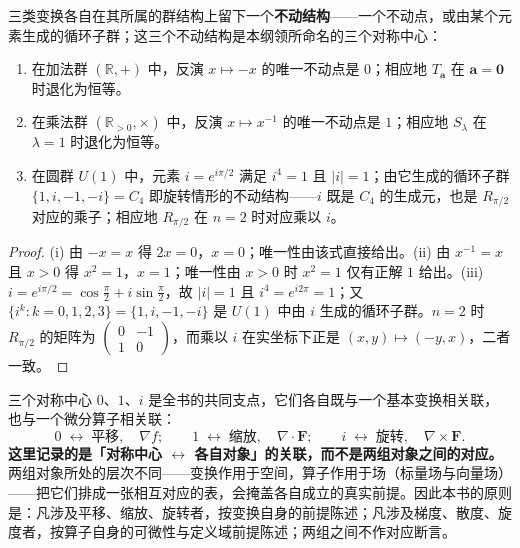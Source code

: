 \begin{proposition}[三个对称中心]\label{prop:three_centres}
三类变换各自在其所属的群结构上留下一个\textbf{不动结构}——一个不动点，或由某个元素生成的循环子群；这三个不动结构是本纲领所命名的三个对称中心：
\begin{enumerate}[label=(\roman*)]
    \item 在加法群 $(\mathbb{R},+)$ 中，反演 $x \mapsto -x$ 的唯一不动点是 $0$；相应地 $T_{\mathbf a}$ 在 $\mathbf a=\mathbf 0$ 时退化为恒等。
    \item 在乘法群 $(\mathbb{R}_{>0},\times)$ 中，反演 $x \mapsto x^{-1}$ 的唯一不动点是 $1$；相应地 $S_\lambda$ 在 $\lambda=1$ 时退化为恒等。
    \item 在圆群 $U(1)$ 中，元素 $i = e^{i\pi/2}$ 满足 $i^4 = 1$ 且 $|i| = 1$；由它生成的循环子群 $\{1,i,-1,-i\}=C_4$ 即旋转情形的不动结构——$i$ 既是 $C_4$ 的生成元，也是 $R_{\pi/2}$ 对应的乘子；相应地 $R_{\pi/2}$ 在 $n=2$ 时对应乘以 $i$。
\end{enumerate}
\end{proposition}

\begin{proof}
(i) 由 $-x=x$ 得 $2x=0$，$x=0$；唯一性由该式直接给出。(ii) 由 $x^{-1}=x$ 且 $x>0$ 得 $x^2=1$，$x=1$；唯一性由 $x>0$ 时 $x^2=1$ 仅有正解 $1$ 给出。(iii) $i=e^{i\pi/2}=\cos\frac\pi2+i\sin\frac\pi2$，故 $|i|=1$ 且 $i^4=e^{i2\pi}=1$；又 $\{i^k:k=0,1,2,3\}=\{1,i,-1,-i\}$ 是 $U(1)$ 中由 $i$ 生成的循环子群。$n=2$ 时 $R_{\pi/2}$ 的矩阵为 $\left(\begin{smallmatrix}0&-1\\1&0\end{smallmatrix}\right)$，而乘以 $i$ 在实坐标下正是 $(x,y)\mapsto(-y,x)$，二者一致。
\end{proof}

\begin{remark}[三个对称中心与两组对象的关联方式]\label{rem:centres_and_two_triples}
三个对称中心 $0$、$1$、$i$ 是全书的共同支点，它们各自既与一个基本变换相关联，也与一个微分算子相关联：
\[
0 \;\longleftrightarrow\; \text{平移},\quad \nabla f;
\qquad
1 \;\longleftrightarrow\; \text{缩放},\quad \nabla\cdot\mathbf{F};
\qquad
i \;\longleftrightarrow\; \text{旋转},\quad \nabla\times\mathbf{F}.
\]
\textbf{这里记录的是「对称中心 $\leftrightarrow$ 各自对象」的关联，而不是两组对象之间的对应。}两组对象所处的层次不同——变换作用于空间，算子作用于场（标量场与向量场）——把它们排成一张相互对应的表，会掩盖各自成立的真实前提。因此本书的原则是：凡涉及平移、缩放、旋转者，按变换自身的前提陈述；凡涉及梯度、散度、旋度者，按算子自身的可微性与定义域前提陈述；两组之间不作对应断言。
\end{remark}

